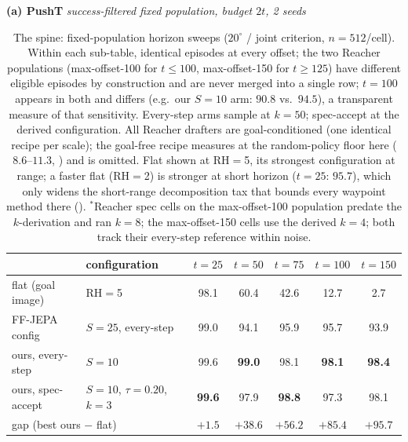 \documentclass{article}
\newcommand{\ours}[1]{\textbf{#1}}
\newcommand{\degc}[1]{$#1^\circ$}
\begin{document}
\begin{table}[h]
\centering
\small
\setlength{\tabcolsep}{6pt}
\caption{The spine: fixed-population horizon sweeps (\degc{20} / joint criterion,
$n{=}512$/cell). Within each sub-table, identical episodes at every offset; the two
Reacher populations (max-offset-100 for $t{\le}100$, max-offset-150 for $t{\ge}125$)
have different eligible episodes by construction and are never merged into a single
row; $t{=}100$ appears in both and differs (e.g.\ our $S{=}10$ arm: $90.8$ vs.\
$94.5$), a transparent measure of that sensitivity. Every-step arms sample at
$k{=}50$; spec-accept at the derived configuration. All Reacher drafters are
goal-conditioned (one identical recipe per scale); the goal-free recipe measures at
the random-policy floor here ($8.6$--$11.3$, \Cref{sec:why-regime}) and is omitted.
Flat shown at RH$=$5, its strongest configuration at range; a faster flat (RH$=$2)
is stronger at short horizon ($t{=}25$: $95.7$), which only widens the short-range
decomposition tax that bounds every waypoint method there (\Cref{sec:why-regime}).
$^{\ast}$Reacher spec cells on the max-offset-100 population predate the
$k$-derivation and ran $k{=}8$; the max-offset-150 cells use the derived $k{=}4$;
both track their every-step reference within noise.}
\label{tab:spine}

\vspace{2pt}
\textbf{(a) PushT} \quad \emph{success-filtered fixed population, budget $2t$, 2 seeds}

\vspace{2pt}
\begin{tabular}{llccccc}
\toprule
& configuration & $t{=}25$ & $t{=}50$ & $t{=}75$ & $t{=}100$ & $t{=}150$ \\
\midrule
flat (goal image)   & RH$=$5                          & 98.1 & 60.4 & 42.6 & 12.7 & 2.7 \\
FF-JEPA config      & $S{=}25$, every-step            & 99.0 & 94.1 & 95.9 & 95.7 & 93.9 \\
ours, every-step    & $S{=}10$                        & 99.6 & \ours{99.0} & 98.1 & \ours{98.1} & \ours{98.4} \\
ours, spec-accept   & $S{=}10$, $\tau{=}0.20$, $k{=}3$ & \ours{99.6} & 97.9 & \ours{98.8} & 97.3 & 98.1 \\
\midrule
\multicolumn{2}{l}{gap (best ours $-$ flat)} & $+1.5$ & $+38.6$ & $+56.2$ & $+85.4$ & $+95.7$ \\
\bottomrule
\end{tabular}


\end{table}
\end{document}
